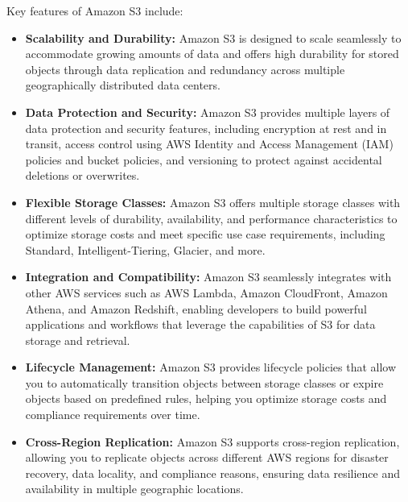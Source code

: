 \documentclass[11pt]{article}
\begin{document}
Key features of Amazon S3 include:

\begin{itemize}
    \item \textbf{Scalability and Durability:} Amazon S3 is designed to scale seamlessly to accommodate growing amounts of data and offers high durability for stored objects through data replication and redundancy across multiple geographically distributed data centers.
    \item \textbf{Data Protection and Security:} Amazon S3 provides multiple layers of data protection and security features, including encryption at rest and in transit, access control using AWS Identity and Access Management (IAM) policies and bucket policies, and versioning to protect against accidental deletions or overwrites.
    \item \textbf{Flexible Storage Classes:} Amazon S3 offers multiple storage classes with different levels of durability, availability, and performance characteristics to optimize storage costs and meet specific use case requirements, including Standard, Intelligent-Tiering, Glacier, and more.
    \item \textbf{Integration and Compatibility:} Amazon S3 seamlessly integrates with other AWS services such as AWS Lambda, Amazon CloudFront, Amazon Athena, and Amazon Redshift, enabling developers to build powerful applications and workflows that leverage the capabilities of S3 for data storage and retrieval.
    \item \textbf{Lifecycle Management:} Amazon S3 provides lifecycle policies that allow you to automatically transition objects between storage classes or expire objects based on predefined rules, helping you optimize storage costs and compliance requirements over time.
    \item \textbf{Cross-Region Replication:} Amazon S3 supports cross-region replication, allowing you to replicate objects across different AWS regions for disaster recovery, data locality, and compliance reasons, ensuring data resilience and availability in multiple geographic locations.
\end{itemize}
\end{document}
